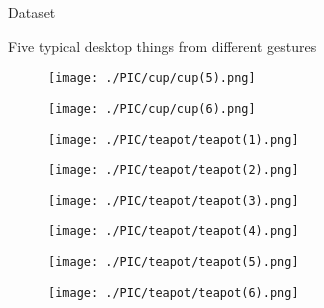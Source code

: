 \documentclass[xcolor=table,compress,blue]{beamer}
\begin{document}
\begin{frame}{Dataset}
\begin{exampleblock}{Five typical desktop things from different gestures}
\begin{figure}[htpb]
\begin{minipage}[b]{0.65in}
				\centerline{ \texttt{[image: ./PIC/cup/cup(5).png]} }
			\end{minipage}
			\begin{minipage}[b]{0.65in}
				\centerline{ \texttt{[image: ./PIC/cup/cup(6).png]} }
			\end{minipage}
			\begin{minipage}[b]{0.65in}
				\centerline{ \texttt{[image: ./PIC/teapot/teapot(1).png]} }
			\end{minipage}
			\begin{minipage}[b]{0.65in}
				\centerline{ \texttt{[image: ./PIC/teapot/teapot(2).png]} }
			\end{minipage}
			\begin{minipage}[b]{0.65in}
				\centerline{ \texttt{[image: ./PIC/teapot/teapot(3).png]} }
			\end{minipage}
			\begin{minipage}[b]{0.65in}
				\centerline{ \texttt{[image: ./PIC/teapot/teapot(4).png]} }
			\end{minipage}
			\begin{minipage}[b]{0.65in}
				\centerline{ \texttt{[image: ./PIC/teapot/teapot(5).png]} }
			\end{minipage}
			\begin{minipage}[b]{0.65in}
				\centerline{ \texttt{[image: ./PIC/teapot/teapot(6).png]} }
			\end{minipage}
			
		\end{figure}
	\end{exampleblock}
\end{frame}
\end{document}

